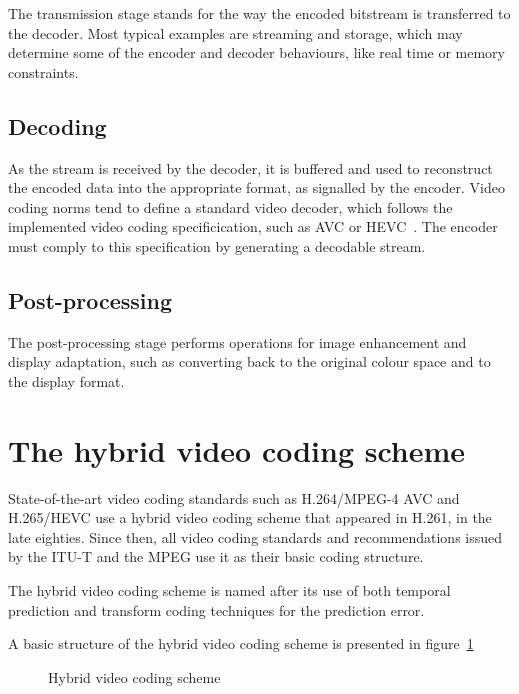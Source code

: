 \documentclass[11pt,a4paper,openright,twoside]{book}
\numberwithin{equation}{section} %
\begin{document}
The transmission stage stands for the way the encoded bitstream is
transferred to the decoder.
Most typical examples are streaming and storage, which may determine
some of the encoder and decoder behaviours, like real time or memory
constraints.

\subsection{Decoding}
\label{sub:decoding}

As the stream is received by the decoder, it is buffered and used to
reconstruct the encoded data into the appropriate format, as signalled
by the encoder.
Video coding norms tend to define a standard video decoder, which
follows the implemented video coding specificication, such as \ac{AVC}
or \ac{HEVC}~\cite{itu-14-h265-hevc-rec,sullivan-12-overview-hevc}.
The encoder must comply to this specification by generating a decodable
stream.

\subsection{Post-processing}
\label{sub:post_processing}

The post-processing stage performs operations for image enhancement and
display adaptation, such as converting back to the original colour
space and to the display format.

\section{The hybrid video coding scheme}
\label{sec:the_hybrid_video_coding_scheme}

State-of-the-art video coding standards such as H.264/\acs{MPEG}-4 \acs{AVC}
and H.265/\acs{HEVC} use a hybrid video coding scheme that appeared in
H.261, in the late eighties.
Since then, all video coding standards and recommendations issued by the
\ac{ITU-T} and the \ac{MPEG} use it as their basic coding structure.

The hybrid video coding scheme is named after its use of both temporal
prediction and transform coding techniques for the prediction error.

A basic structure of the hybrid video coding scheme is presented in
figure~\ref{fig:hybrid_video_coding_scheme}

\begin{figure}[h]
	\centering
	
	\caption{Hybrid video coding scheme}
	\label{fig:hybrid_video_coding_scheme}
\end{figure}
\end{document}
